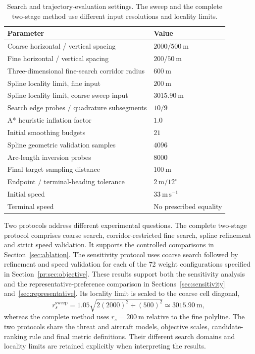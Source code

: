 \documentclass[preprint,12pt]{elsarticle}
\begin{document}
\begin{table}[t]
 \centering
 \caption{Search and trajectory-evaluation settings. The sweep and the
 complete two-stage method use different input resolutions and locality limits.}
 \label{tab:planning}
 \small
 \begin{tabular}{ll}
 \hline
 Parameter & Value \\
 \hline
 Coarse horizontal / vertical spacing & $2000 / 500~\mathrm{m}$ \\
 Fine horizontal / vertical spacing & $200 / 50~\mathrm{m}$ \\
 Three-dimensional fine-search corridor radius & $600~\mathrm{m}$ \\
 Spline locality limit, fine input & $200~\mathrm{m}$ \\
 Spline locality limit, coarse sweep input & $3015.90~\mathrm{m}$ \\
 Search edge probes / quadrature subsegments & $10 / 9$ \\
 A* heuristic inflation factor & $1.0$ \\
 Initial smoothing budgets & $21$ \\
 Spline geometric validation samples & $4096$ \\
 Arc-length inversion probes & $8000$ \\
 Final target sampling distance & $100~\mathrm{m}$ \\
 Endpoint / terminal-heading tolerance & $2~\mathrm{m} / 12^\circ$ \\
 Initial speed & $33~\mathrm{m\,s^{-1}}$ \\
 Terminal speed & No prescribed equality \\
 \hline
 \end{tabular}
\end{table}

Two protocols address different experimental questions. The complete
two-stage protocol comprises coarse search, corridor-restricted fine search,
spline refinement and strict speed validation. It supports the controlled
comparisons in Section~\ref{sec:ablation}. The sensitivity protocol
uses coarse search followed by refinement and speed validation for each
of the 72 weight configurations specified in
Section~\ref{pr:sec:objective}. These results support both the sensitivity
analysis and the representative-preference comparison in
Sections~\ref{sec:sensitivity} and~\ref{sec:representative}. Its locality limit is scaled to the coarse
cell diagonal,
\begin{equation}
 r_s^{\mathrm{sweep}}=1.05\sqrt{2(2000)^2+(500)^2}
                    \simeq3015.90~\mathrm{m},
 \label{ex:eq:sweeptrust}
\end{equation}
whereas the complete method uses $r_s=200~\mathrm{m}$ relative to the fine
polyline. The two protocols share the threat and aircraft models, objective
scales, candidate-ranking rule and final metric definitions. Their
different search domains and locality limits are retained explicitly
when interpreting the results.
\end{document}
